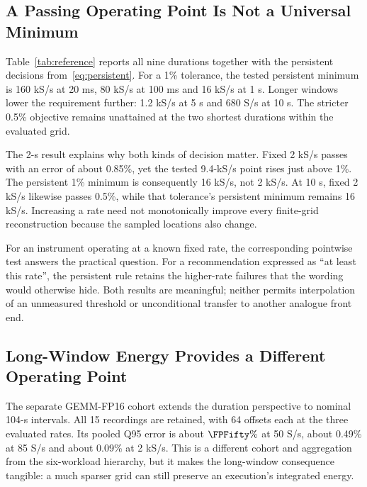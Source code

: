 \subsection{A Passing Operating Point Is Not a Universal Minimum}
Table~\ref{tab:reference} reports all nine durations together with the persistent decisions from~\eqref{eq:persistent}. For a 1\% tolerance, the tested persistent minimum is 160 kS/s at 20 ms, 80 kS/s at 100 ms and 16 kS/s at 1 s. Longer windows lower the requirement further: 1.2 kS/s at 5 s and 680 S/s at 10 s. The stricter 0.5\% objective remains unattained at the two shortest durations within the evaluated grid.

\begin{table}[t]
\caption{Native Jetson energy reconstruction over all nine durations. Error is the hierarchical envelope at a fixed 2 kS/s. The two $f_{\min}$ columns require that rate and every higher eligible tested rate to pass. A dash means not attained up to 160 kS/s, not an inferred requirement beyond it.}
\label{tab:reference}
\centering\footnotesize

\end{table}

The 2-s result explains why both kinds of decision matter. Fixed 2 kS/s passes with an error of about 0.85\%, yet the tested 9.4-kS/s point rises just above 1\%. The persistent 1\% minimum is consequently 16 kS/s, not 2 kS/s. At 10 s, fixed 2 kS/s likewise passes 0.5\%, while that tolerance's persistent minimum remains 16 kS/s. Increasing a rate need not monotonically improve every finite-grid reconstruction because the sampled locations also change.

For an instrument operating at a known fixed rate, the corresponding pointwise test answers the practical question. For a recommendation expressed as ``at least this rate'', the persistent rule retains the higher-rate failures that the wording would otherwise hide. Both results are meaningful; neither permits interpolation of an unmeasured threshold or unconditional transfer to another analogue front end.

\subsection{Long-Window Energy Provides a Different Operating Point}
The separate GEMM-FP16 cohort extends the duration perspective to nominal 104-s intervals. All 15 recordings are retained, with 64 offsets each at the three evaluated rates. Its pooled Q95 error is about $\FPFifty\%$ at 50 S/s, about 0.49\% at 85 S/s and about 0.09\% at 2 kS/s. This is a different cohort and aggregation from the six-workload hierarchy, but it makes the long-window consequence tangible: a much sparser grid can still preserve an execution's integrated energy.

